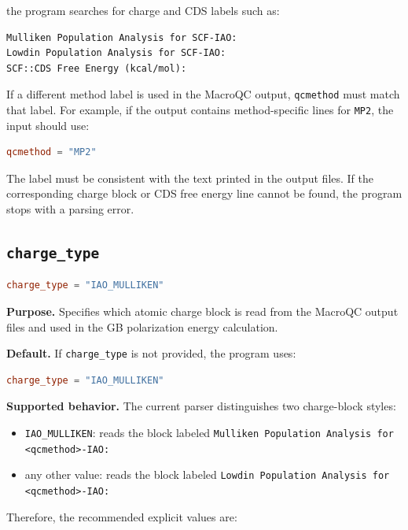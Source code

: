 \documentclass[11pt]{article}
\begin{document}
the program searches for charge and CDS labels such as:

\begin{lstlisting}
Mulliken Population Analysis for SCF-IAO:
Lowdin Population Analysis for SCF-IAO:
SCF::CDS Free Energy (kcal/mol):
\end{lstlisting}

If a different method label is used in the MacroQC output, \texttt{qcmethod}
must match that label. For example, if the output contains method-specific lines
for \texttt{MP2}, the input should use:

\begin{lstlisting}[language=toml]
qcmethod = "MP2"
\end{lstlisting}

The label must be consistent with the text printed in the output files. If the
corresponding charge block or CDS free energy line cannot be found, the program
stops with a parsing error.

\subsection{\texttt{charge\_type}}

\begin{lstlisting}[language=toml]
charge_type = "IAO_MULLIKEN"
\end{lstlisting}

\textbf{Purpose.}
Specifies which atomic charge block is read from the MacroQC output files and
used in the GB polarization energy calculation.

\textbf{Default.}
If \texttt{charge\_type} is not provided, the program uses:

\begin{lstlisting}[language=toml]
charge_type = "IAO_MULLIKEN"
\end{lstlisting}

\textbf{Supported behavior.}
The current parser distinguishes two charge-block styles:

\begin{itemize}[leftmargin=*]
  \item \texttt{IAO\_MULLIKEN}: reads the block labeled
        \texttt{Mulliken Population Analysis for <qcmethod>-IAO:}
  \item any other value: reads the block labeled
        \texttt{Lowdin Population Analysis for <qcmethod>-IAO:}
\end{itemize}

Therefore, the recommended explicit values are:
\end{document}
